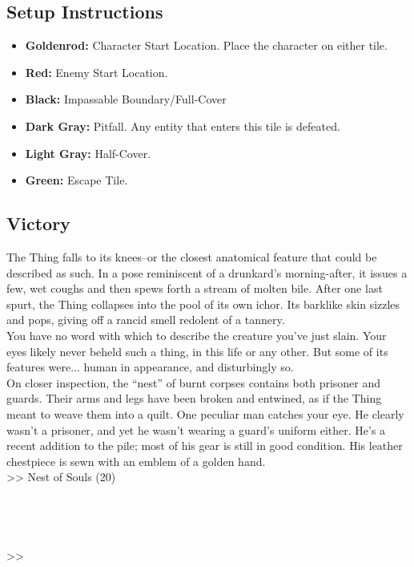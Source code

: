 \subsection*{Setup Instructions}
\begin{itemize}
\item \textbf{Goldenrod:} Character Start Location. Place the character on either tile.
\item \textbf{Red:} Enemy Start Location.
\item \textbf{Black:} Impassable Boundary/Full-Cover
\item \textbf{Dark Gray:} Pitfall. Any entity that enters this tile is defeated.
\item \textbf{Light Gray:} Half-Cover.
\item \textbf{Green:} Escape Tile.
\end{itemize}

\pagebreak

\subsection*{Victory}
The Thing falls to its knees--or the closest anatomical feature that could be described as such. In a pose reminiscent of a drunkard’s morning-after, it issues a few, wet coughs and then spews forth a stream of molten bile. After one last spurt, the Thing collapses into the pool of its own ichor. Its barklike skin sizzles and pops, giving off a rancid smell redolent of a tannery.\\

You have no word with which to describe the creature you’ve just slain. Your eyes likely never beheld such a thing, in this life or any other. But some of its features were... human in appearance, and disturbingly so.\\

On closer inspection, the “nest” of burnt corpses contains both prisoner and guards. Their arms and legs have been broken and entwined, as if the Thing meant to weave them into a quilt. One peculiar man catches your eye. He clearly wasn’t a prisoner, and yet he wasn’t wearing a guard’s uniform either. He’s a recent addition to the pile; most of his gear is still in good condition. His leather chestpiece is sewn with an emblem of a golden hand.\\

>> Nest of Souls (20)\\
\\
\\
\\
\\
>> 

